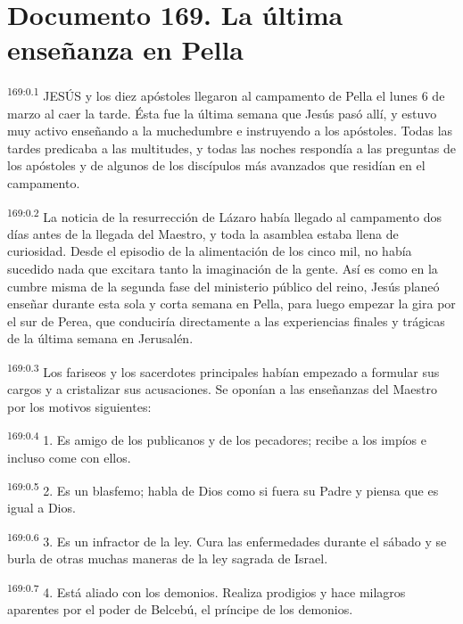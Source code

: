 \chapter{Documento 169. La última enseñanza en Pella}
\par 
\textsuperscript{169:0.1} JESÚS y los diez apóstoles llegaron al campamento de Pella el lunes 6 de marzo al caer la tarde. Ésta fue la última semana que Jesús pasó allí, y estuvo muy activo enseñando a la muchedumbre e instruyendo a los apóstoles. Todas las tardes predicaba a las multitudes, y todas las noches respondía a las preguntas de los apóstoles y de algunos de los discípulos más avanzados que residían en el campamento.

\par 
\textsuperscript{169:0.2} La noticia de la resurrección de Lázaro había llegado al campamento dos días antes de la llegada del Maestro, y toda la asamblea estaba llena de curiosidad. Desde el episodio de la alimentación de los cinco mil, no había sucedido nada que excitara tanto la imaginación de la gente. Así es como en la cumbre misma de la segunda fase del ministerio público del reino, Jesús planeó enseñar durante esta sola y corta semana en Pella, para luego empezar la gira por el sur de Perea, que conduciría directamente a las experiencias finales y trágicas de la última semana en Jerusalén.

\par 
\textsuperscript{169:0.3} Los fariseos y los sacerdotes principales habían empezado a formular sus cargos y a cristalizar sus acusaciones. Se oponían a las enseñanzas del Maestro por los motivos siguientes:

\par 
\textsuperscript{169:0.4} 1. Es amigo de los publicanos y de los pecadores; recibe a los impíos e incluso come con ellos.

\par 
\textsuperscript{169:0.5} 2. Es un blasfemo; habla de Dios como si fuera su Padre y piensa que es igual a Dios.

\par 
\textsuperscript{169:0.6} 3. Es un infractor de la ley. Cura las enfermedades durante el sábado y se burla de otras muchas maneras de la ley sagrada de Israel.

\par 
\textsuperscript{169:0.7} 4. Está aliado con los demonios. Realiza prodigios y hace milagros aparentes por el poder de Belcebú, el príncipe de los demonios.


